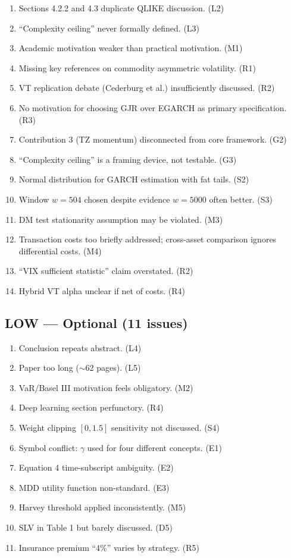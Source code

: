 \documentclass[12pt,a4paper]{article}
\begin{document}
\begin{enumerate}[label=M\arabic*.]
\item Sections 4.2.2 and 4.3 duplicate QLIKE discussion. (L2)
\item ``Complexity ceiling'' never formally defined. (L3)
\item Academic motivation weaker than practical motivation. (M1)
\item Missing key references on commodity asymmetric volatility. (R1)
\item VT replication debate (Cederburg et al.) insufficiently discussed. (R2)
\item No motivation for choosing GJR over EGARCH as primary specification. (R3)
\item Contribution 3 (TZ momentum) disconnected from core framework. (G2)
\item ``Complexity ceiling'' is a framing device, not testable. (G3)
\item Normal distribution for GARCH estimation with fat tails. (S2)
\item Window $w = 504$ chosen despite evidence $w = 5000$ often better. (S3)
\item DM test stationarity assumption may be violated. (M3)
\item Transaction costs too briefly addressed; cross-asset comparison ignores differential costs. (M4)
\item ``VIX sufficient statistic'' claim overstated. (R2)
\item Hybrid VT alpha unclear if net of costs. (R4)
\end{enumerate}

\subsection*{\textcolor{okgreen}{LOW --- Optional (11 issues)}}

\begin{enumerate}[label=O\arabic*.]
\item Conclusion repeats abstract. (L4)
\item Paper too long ($\sim$62 pages). (L5)
\item VaR/Basel III motivation feels obligatory. (M2)
\item Deep learning section perfunctory. (R4)
\item Weight clipping $[0, 1.5]$ sensitivity not discussed. (S4)
\item Symbol conflict: $\gamma$ used for four different concepts. (E1)
\item Equation 4 time-subscript ambiguity. (E2)
\item MDD utility function non-standard. (E3)
\item Harvey threshold applied inconsistently. (M5)
\item SLV in Table 1 but barely discussed. (D5)
\item Insurance premium ``4\%'' varies by strategy. (R5)
\end{enumerate}
\end{document}
